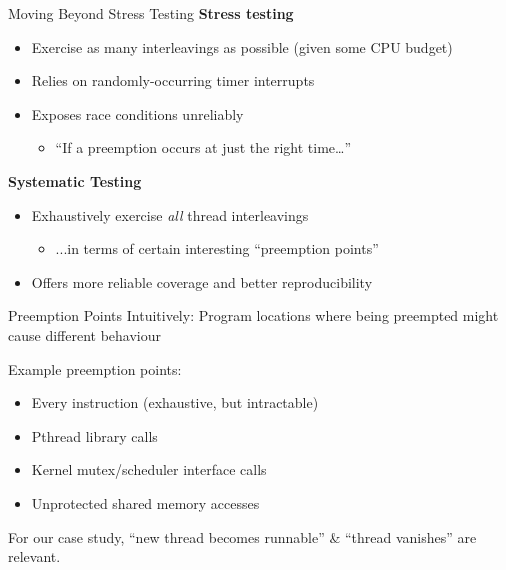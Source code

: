 \documentclass[xcolor=dvipsnames]{beamer}
\begin{document}

\begin{frame}{Moving Beyond Stress Testing}
	\textbf{Stress testing}
	\begin{itemize}
		\item Exercise as many interleavings as possible (given some CPU budget)
		\item Relies on randomly-occurring timer interrupts
		\item Exposes race conditions unreliably
		\begin{itemize}
			\item ``If a preemption occurs at just the right time\ldots''
		\end{itemize}
	\end{itemize}
	\pause
	\linegap

	{\bf Systematic Testing}
	\begin{itemize}
		\item Exhaustively exercise {\em all} thread interleavings
		\begin{itemize}
			\item ...in terms of certain interesting ``preemption points''
		\end{itemize}
		\item Offers more reliable coverage and better reproducibility
	\end{itemize}
\end{frame}

\begin{frame}{Preemption Points}
	Intuitively: Program locations where being preempted might cause different behaviour
	\linegap

	Example preemption points:
	\begin{itemize}
		\item Every instruction (exhaustive, but intractable)
		\item Pthread library calls
		\item Kernel mutex/scheduler interface calls
		\item Unprotected shared memory accesses %
	\end{itemize}
	\pause
	\linegap

	For our case study, ``new thread becomes runnable'' \& ``thread vanishes'' are relevant.
\end{frame}
\end{document}
